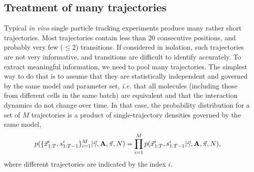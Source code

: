 \subsection{Treatment of many trajectories}
Typical \textit{in vivo} single particle tracking experiments produce
many rather short trajectories. Most trajectories contain less than 20
consecutive positions, and probably very few ($\le 2$) transitions. If
considered in isolation, such trajectories are not very informative,
and transitions are difficult to identify accurately. To extract
meaningful information, we need to pool many trajectories. The
simplest way to do that is to assume that they are statistically
independent and governed by the same model and parameter
set, \textit{i.e.}  that all molecules (including those from
different cells in the same batch) are equivalent and that the
interaction dynamics do not change over time. In that case, the
probability distribution for a set of $M$ trajectories is a product of
single-trajectory densities governed by the same model,
\begin{equation}\label{eq:pxs}
p(\{\vec{x}^i_{1:T},s^i_{1:T-1}\}_{i=1}^M|\vec{\gamma},\mathbf{A},\vec\pi,N)
=\prod_{i=1}^Mp(\vec{x}^i_{1:T},s^i_{1:T-1}|\vec{\gamma},\mathbf{A},\vec\pi,N),
\end{equation}
where different trajectories are indicated by the index $i$.




